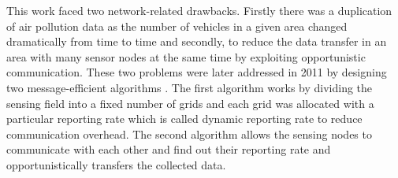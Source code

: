  This work faced two network-related drawbacks. Firstly there was a duplication of air pollution data as the number of vehicles in a given area changed dramatically from time to time and secondly, to reduce the data transfer in an area with many sensor nodes at the same time by exploiting opportunistic communication. These two problems were later addressed in 2011 by designing two message-efficient algorithms \cite{Hu2011}. The first algorithm works by dividing the sensing field into a fixed number of grids and each grid was allocated with a particular reporting rate which is called dynamic reporting rate to reduce communication overhead. The second algorithm allows the sensing nodes to communicate with each other and find out their reporting rate and opportunistically transfers the collected data. %




\par

